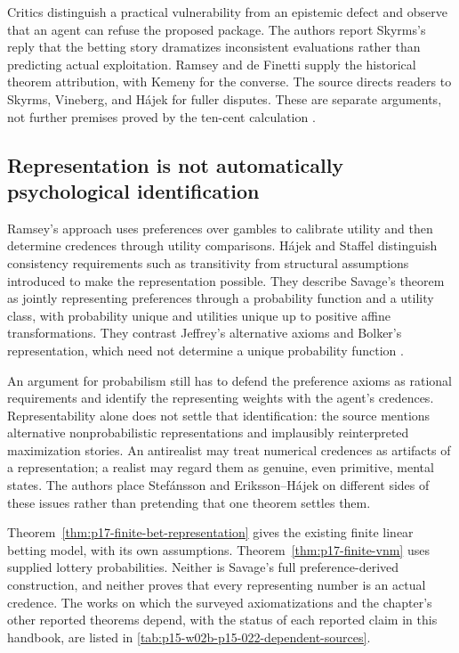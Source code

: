Critics distinguish a practical vulnerability from an epistemic defect
and observe that an agent can refuse the proposed package. The authors
report Skyrms's reply that the betting story dramatizes inconsistent
evaluations rather than predicting actual exploitation. Ramsey and de
Finetti supply the historical theorem attribution, with Kemeny for the
converse. The source directs readers to Skyrms, Vineberg, and H\'ajek
for fuller disputes. These are separate arguments, not further premises
proved by the ten-cent calculation
\parencite[pp.~240--241]{HajekStaffel2021Dynamics}.

\subsection{Representation is not automatically psychological identification}

Ramsey's approach uses preferences over gambles to calibrate utility and
then determine credences through utility comparisons. H\'ajek and Staffel
distinguish consistency requirements such as transitivity from structural
assumptions introduced to make the representation possible. They describe
Savage's theorem as jointly representing preferences through a probability
function and a utility class, with probability unique and utilities unique
up to positive affine transformations. They contrast Jeffrey's alternative
axioms and Bolker's representation, which need not determine a unique
probability function
\parencite[p.~241]{HajekStaffel2021Dynamics}.

An argument for probabilism still has to defend the preference axioms
as rational requirements and identify the representing weights with the
agent's credences. Representability alone does not settle that
identification: the source mentions alternative nonprobabilistic
representations and implausibly reinterpreted maximization stories.
An antirealist may treat numerical credences as artifacts of a
representation; a realist may regard them as genuine, even primitive,
mental states. The authors place Stef\'ansson and Eriksson--H\'ajek on
different sides of these issues rather than pretending that one theorem
settles them.

Theorem~\ref{thm:p17-finite-bet-representation} gives the existing finite
linear betting model, with its own assumptions. Theorem~\ref{thm:p17-finite-vnm}
uses supplied lottery probabilities. Neither is Savage's full
preference-derived construction, and neither proves that every
representing number is an actual credence. The works on which the
surveyed axiomatizations and the chapter's other reported theorems depend,
with the status of each reported claim in this handbook, are listed in
\cref{tab:p15-w02b-p15-022-dependent-sources}.

